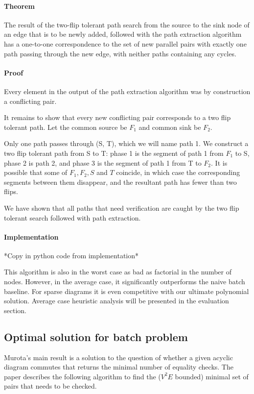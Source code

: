 \documentclass[runningheads]{llncs}
\begin{document}
\paragraph{Theorem} The result of the two-flip tolerant path search from the source to the sink node of an edge that is to be newly added, followed with the path extraction algorithm has a one-to-one correspondence to the set of new parallel pairs with exactly one path passing through the new edge, with neither paths containing any cycles.

\paragraph{Proof}

Every element in the output of the path extraction algorithm was by construction a conflicting pair.

It remains to show that every new conflicting pair corresponds to a two flip tolerant path. Let the common source be $F_1$ and common sink be $F_2$. 

Only one path passes through (S, T), which we will name path 1. We construct a two flip tolerant path from S to T: phase 1 is the segment of path 1 from $F_1$ to S, phase 2 is path 2, and phase 3 is the segment of path 1 from T to $F_2$. It is possible that some of $F_1, F_2, S$ and $T$ coincide, in which case the corresponding segments between them disappear, and the resultant path has fewer than two flips.

We have shown that all paths that need verification are caught by the two flip tolerant search followed with path extraction.

\paragraph{Implementation}
*Copy in python code from implementation*

This algorithm is also in the worst case as bad as factorial in the number of nodes. However, in the average case, it significantly outperforms the naive batch baseline. For sparse diagrams it is even competitive with our ultimate polynomial solution. Average case heuristic analysis will be presented in the evaluation section.

\subsection{Optimal solution for batch problem}
Murota's main result \cite{commutative} is a solution to the question of whether a given acyclic diagram commutes that returns the minimal number of equality checks. The paper describes the following algorithm to find the ($V^2E$ bounded) minimal set of pairs that needs to be checked.
\end{document}
